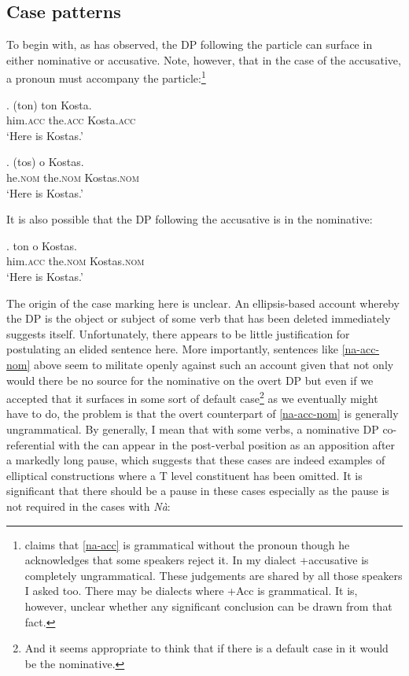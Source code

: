 \documentclass[output=paper]{LSP/langsci}
\begin{document}
\subsection{Case patterns}
To begin with, as \citet{Tzartzanos:46} has observed, the DP following the particle can surface in either nominative or accusative.  Note, however, that in the case of the accusative, a  pronoun must accompany the particle:\footnote{\label{jofoot}\citet{joseph:81} claims that \ref{na-acc} is grammatical without the  pronoun though he acknowledges that some speakers reject it.  In my dialect \na+accusative is completely ungrammatical.   These judgements are shared by all those speakers I asked too.  There may be dialects where \na+Acc is grammatical.  It is, however, unclear whether any significant conclusion can be drawn from that fact.}


\exg.
\na *(ton) ton Kosta.\\
\na him.\textsc{acc} the.\textsc{acc} Kosta.\textsc{acc}\\ \label{na-acc}
\glt `Here is Kostas.'

\exg.
\na (tos) o Kostas.\\
\na he.\textsc{nom} the.\textsc{nom} Kostas.\textsc{nom}\\\label{na-nom}
\glt `Here is Kostas.'

It is also possible that the DP following the accusative  is in the nominative:

\exg.
\na ton o Kostas.\\
\na him.\textsc{acc} the.\textsc{nom} Kostas.\textsc{nom}\\ \label{na-acc-nom}
\glt `Here is Kostas.'


The origin of the case marking here is unclear.  An ellipsis-based account whereby the DP is the object or subject of some verb that has been deleted immediately suggests itself. Unfortunately, there appears to be little justification for postulating an elided sentence here.  More importantly, sentences like  \ref{na-acc-nom} above seem to militate openly against such an account given that not only would there be no source for the nominative on the overt DP but even if we accepted that it surfaces in some sort of default case\footnote{And it seems appropriate to think that if there is a default case in  it would be the nominative.} as we eventually might have to do, the problem is that the overt counterpart of \ref{na-acc-nom} is generally ungrammatical.  By generally, I mean that with some verbs, a nominative DP co-referential with the  can appear in the post-verbal position as an apposition after a markedly long pause, which suggests that these cases are indeed examples of elliptical constructions where a T level constituent has been omitted.  It is significant that there should be a pause in these cases especially as the pause is not required in the cases with \textit{N\`{a}}:
\end{document}
